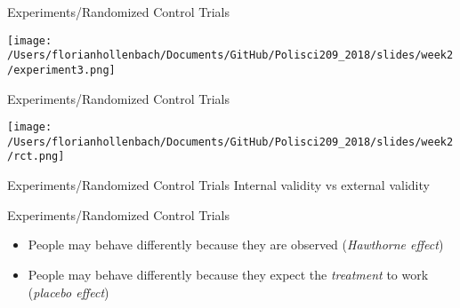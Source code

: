 \documentclass[presentation]{beamer}
\begin{document}
\begin{frame}[label={sec:org39d6098}]{Experiments/Randomized Control Trials}
\begin{center}
\texttt{[image: /Users/florianhollenbach/Documents/GitHub/Polisci209\_2018/slides/week2/experiment3.png]}
\end{center}
\end{frame}


\begin{frame}[label={sec:orge9096fa}]{Experiments/Randomized Control Trials}
\begin{center}
\texttt{[image: /Users/florianhollenbach/Documents/GitHub/Polisci209\_2018/slides/week2/rct.png]}
\end{center}
\end{frame}


\begin{frame}[label={sec:org343b55f}]{Experiments/Randomized Control Trials}
\Large{Internal validity vs external validity}
\end{frame}


\begin{frame}[label={sec:org3318ba2}]{Experiments/Randomized Control Trials}
\begin{itemize}
\item People may behave differently because they are observed (\emph{Hawthorne effect})
\item People may behave differently because they expect the \emph{treatment} to work (\emph{placebo effect})
\end{itemize}
\end{frame}
\end{document}

